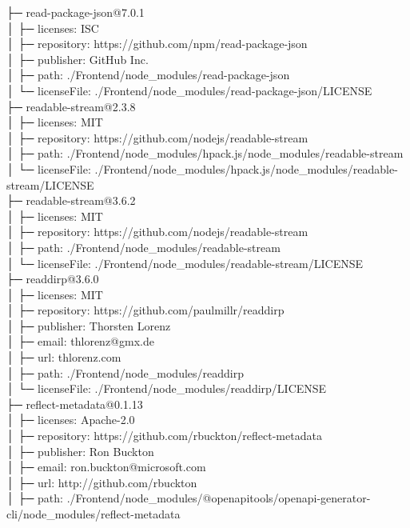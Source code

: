 ├─ read-package-json@7.0.1\\
│  ├─ licenses: ISC\\
│  ├─ repository: https://github.com/npm/read-package-json\\
│  ├─ publisher: GitHub Inc.\\
│  ├─ path: ./Frontend/node\_modules/read-package-json\\
│  └─ licenseFile: ./Frontend/node\_modules/read-package-json/LICENSE\\
├─ readable-stream@2.3.8\\
│  ├─ licenses: MIT\\
│  ├─ repository: https://github.com/nodejs/readable-stream\\
│  ├─ path: ./Frontend/node\_modules/hpack.js/node\_modules/readable-stream\\
│  └─ licenseFile: ./Frontend/node\_modules/hpack.js/node\_modules/readable-stream/LICENSE\\
├─ readable-stream@3.6.2\\
│  ├─ licenses: MIT\\
│  ├─ repository: https://github.com/nodejs/readable-stream\\
│  ├─ path: ./Frontend/node\_modules/readable-stream\\
│  └─ licenseFile: ./Frontend/node\_modules/readable-stream/LICENSE\\
├─ readdirp@3.6.0\\
│  ├─ licenses: MIT\\
│  ├─ repository: https://github.com/paulmillr/readdirp\\
│  ├─ publisher: Thorsten Lorenz\\
│  ├─ email: thlorenz@gmx.de\\
│  ├─ url: thlorenz.com\\
│  ├─ path: ./Frontend/node\_modules/readdirp\\
│  └─ licenseFile: ./Frontend/node\_modules/readdirp/LICENSE\\
├─ reflect-metadata@0.1.13\\
│  ├─ licenses: Apache-2.0\\
│  ├─ repository: https://github.com/rbuckton/reflect-metadata\\
│  ├─ publisher: Ron Buckton\\
│  ├─ email: ron.buckton@microsoft.com\\
│  ├─ url: http://github.com/rbuckton\\
│  ├─ path: ./Frontend/node\_modules/@openapitools/openapi-generator-cli/node\_modules/reflect-metadata\\
